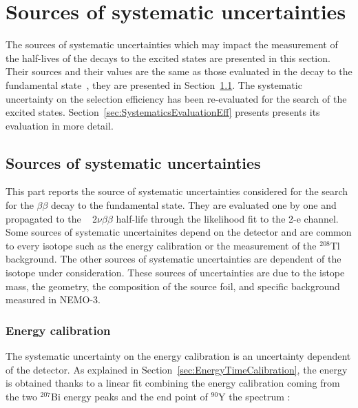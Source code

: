 \documentclass[main.tex]{subfiles}
\begin{document}
\FloatBarrier


\section{Sources of systematic uncertainties}\label{sec:SourceOfSystematics}


\NI The sources of systematic uncertainties which may impact the measurement of the half-lives of the decays to the excited states are presented in this section. Their sources and their values are the same as those evaluated in the decay to the fundamental state~\cite{Arnold2016bed}, they are presented in Section~\ref{sec:CurrentSystematics}. The systematic uncertainty on  the selection efficiency has been re-evaluated for the search of the excited states. Section~\ref{sec:SystematicsEvaluationEff} presents presents its evaluation in more detail. 



\subsection{Sources of systematic uncertainties} \label{sec:CurrentSystematics}


\NI This part reports the source of systematic uncertainties considered for the search for the $\beta\beta$ decay to the fundamental state. They are evaluated one by one and propagated to the \Cd~ 2$\nu\beta\beta$ half-life through the likelihood fit to the 2-e channel. Some sources of systematic uncertainites depend on the detector and are common to every isotope such as the energy calibration or the measurement of the $^{\text{208}}$Tl background. The other sources of systematic uncertainties are dependent of the isotope under consideration. These sources of uncertainties are due to the istope mass, the geometry, the composition of the source foil, and specific background measured in NEMO-3. 


\subsubsection{Energy calibration}


\NI The systematic uncertainty on the energy calibration is an uncertainty dependent of the detector. As explained in Section~\ref{sec:EnergyTimeCalibration}, the energy is obtained thanks to a linear fit combining the energy calibration coming from the two $^{\text{207}}$Bi energy peaks and the end point of $^{\text{90}}$Y the spectrum :
\end{document}
